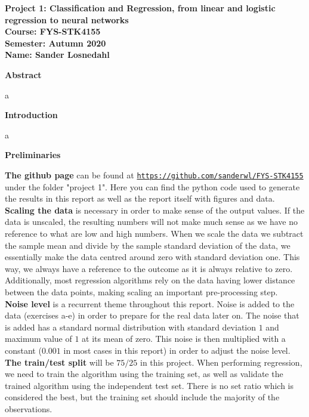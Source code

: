 \documentclass[12pt,a4paper]{article}
\begin{document}
\begin{center}
\LARGE{\textbf{Project 1: Classification and Regression, from linear and logistic regression to neural networks}}
\\
\large{\textbf{Course: FYS-STK4155}}
\\
\large{\textbf{Semester: Autumn 2020}}
\\
\large{\textbf{Name: Sander Losnedahl}}
\end{center}

\begin{center}
\Large{\textbf{Abstract}}
\end{center}

\noindent a

\newpage

\begin{center}
\Large{\textbf{Introduction}}
\end{center}

\noindent a

\newpage

\begin{center}
\Large{\textbf{Preliminaries}}
\end{center}

\noindent \textbf{The github page} can be found at \href{{https://github.com/sanderwl/FYS-STK4155}}{\nolinkurl{https://github.com/sanderwl/FYS-STK4155}} under the folder "project 1". Here you can find the python code used to generate the results in this report as well as the report itself with figures and data.
\\
\textbf{Scaling the data} is necessary in order to make sense of the output values. If the data is unscaled, the resulting numbers will not make much sense as we have no reference to what are low and high numbers. When we scale the data we subtract the sample mean and divide by the sample standard deviation of the data, we essentially make the data centred around zero with standard deviation one. This way, we always have a reference to the outcome as it is always relative to zero. Additionally, most regression algorithms rely on the data having lower distance between the data points, making scaling an important pre-processing step.
\\
\textbf{Noise level} is a recurrent theme throughout this report. Noise is added to the data (exercises a-e) in order to prepare for the real data later on. The noise that is added has a standard normal distribution with standard deviation $1$ and maximum value of $1$ at its mean of zero. This noise is then multiplied with a constant ($0.001$ in most cases in this report) in order to adjust the noise level. 
\\
\textbf{The train/test split} will be $75/25$ in this project. When performing regression, we need to train the algorithm using the training set, as well as validate the trained algorithm using the independent test set. There is no set ratio which is considered the best, but the training set should include the majority of the observations. 
\end{document}
